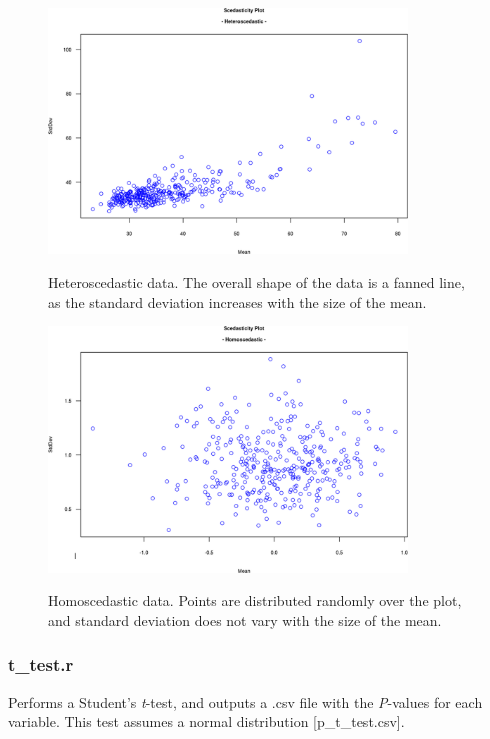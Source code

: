 \documentclass[english,a4paper,12pt]{article}
\begin{document}
\begin{figure}[p]
\centering
\includegraphics[width=0.85\textwidth]{images/heterosced.png} \\
\caption[Heteroscedasticity]{Heteroscedastic data. The overall shape of the data is a fanned line, as the standard deviation increases with the size of the mean.}
\label{fig:heterosced}
\end{figure}

\begin{figure}[p]
\centering
\includegraphics[width=0.85\textwidth]{images/homosced.png} \\
\caption[Homoscedasticity]{Homoscedastic data. Points are distributed randomly over the plot, and standard deviation does not vary with the size of the mean.}
\label{fig:homosced}
\end{figure}

\subsubsection*{t\_test.r}
Performs a Student's \emph{t}-test, and outputs a .csv file with the \emph{P}-values for each variable. This test assumes a normal distribution [\textsf{p\_t\_test.csv}].
\end{document}
